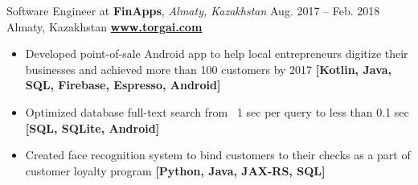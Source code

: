 \documentclass[10pt,a4paper]{altacv}
\begin{document}
    \medskip

    \cveventflat
    {Software Engineer at }
    {\textbf{FinApps}, \textit{Almaty, Kazakhstan}}
    {Aug. 2017 -- Feb. 2018}
    {Almaty, Kazakhstan}
    \newline
    \href{https://torgai.com/}{\textbf{www.torgai.com}}
    \begin{itemize}
        \item Developed point-of-sale Android app to help local entrepreneurs digitize their businesses and achieved more than 100 customers by 2017
        \textbf{[Kotlin, Java, SQL, Firebase, Espresso, Android]}
        \item Optimized database full-text search from ~1 sec per query to less than 0.1 sec
        \textbf{[SQL, SQLite, Android]}
        \item Created face recognition system to bind customers to their checks as a part of customer loyalty program
        \textbf{[Python, Java, JAX-RS, SQL]}
    \end{itemize}

    



    \clearpage
\end{document}
